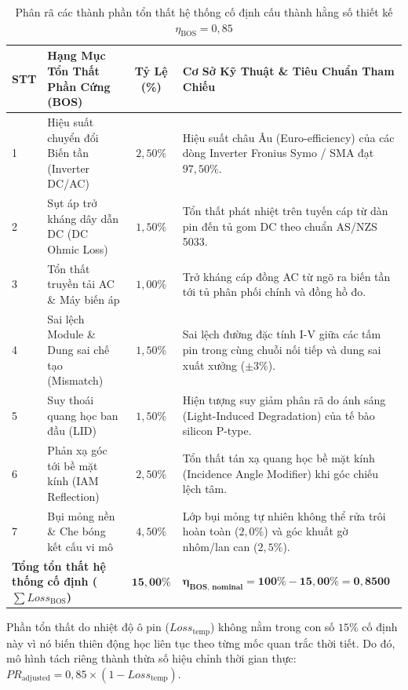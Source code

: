 \documentclass[12pt, a4paper]{report}
\begin{document}
\begin{table}[H]
\centering
\caption{Phân rã các thành phần tổn thất hệ thống cố định cấu thành hằng số thiết kế $\eta_{\text{BOS}} = 0{,}85$}
\label{tab:bos_derate_breakdown}
\small
\renewcommand{\arraystretch}{1.25}
\begin{tabularx}{\textwidth}{@{} l >{\raggedright\arraybackslash}p{4.8cm} c X @{}}
\toprule
\textbf{STT} & \textbf{Hạng Mục Tổn Thất Phần Cứng (BOS)} & \textbf{Tỷ Lệ (\%)} & \textbf{Cơ Sở Kỹ Thuật \& Tiêu Chuẩn Tham Chiếu} \\
\midrule
1 & Hiệu suất chuyển đổi Biến tần (Inverter DC/AC) & $2{,}50\%$ & Hiệu suất châu Âu (Euro-efficiency) của các dòng Inverter Fronius Symo / SMA đạt $97{,}50\%$. \\
2 & Sụt áp trở kháng dây dẫn DC (DC Ohmic Loss)     & $1{,}50\%$ & Tổn thất phát nhiệt trên tuyến cáp từ dàn pin đến tủ gom DC theo chuẩn AS/NZS 5033. \\
3 & Tổn thất truyền tải AC \& Máy biến áp            & $1{,}00\%$ & Trở kháng cáp đồng AC từ ngõ ra biến tần tới tủ phân phối chính và đồng hồ đo. \\
4 & Sai lệch Module \& Dung sai chế tạo (Mismatch)   & $1{,}50\%$ & Sai lệch đường đặc tính I-V giữa các tấm pin trong cùng chuỗi nối tiếp và dung sai xuất xưởng ($\pm 3\%$). \\
5 & Suy thoái quang học ban đầu (LID)               & $1{,}50\%$ & Hiện tượng suy giảm phân rã do ánh sáng (Light-Induced Degradation) của tế bào silicon P-type. \\
6 & Phản xạ góc tới bề mặt kính (IAM Reflection)    & $2{,}50\%$ & Tổn thất tán xạ quang học bề mặt kính (Incidence Angle Modifier) khi góc chiếu lệch tâm. \\
7 & Bụi mỏng nền \& Che bóng kết cấu vi mô           & $4{,}50\%$ & Lớp bụi mỏng tự nhiên không thể rửa trôi hoàn toàn ($2{,}0\%$) và góc khuất gờ nhôm/lan can ($2{,}5\%$). \\
\midrule
\multicolumn{2}{l}{\textbf{Tổng tổn thất hệ thống cố định ($\sum Loss_{\text{BOS}}$)}} & $\mathbf{15{,}00\%}$ & $\mathbf{\eta_{\text{BOS, nominal}} = 100\% - 15{,}00\% = 0{,}8500}$ \\
\bottomrule
\end{tabularx}
\end{table}

Phần tổn thất do nhiệt độ ô pin ($Loss_{\text{temp}}$) không nằm trong con số $15\%$ cố định này vì nó biến thiên động học liên tục theo từng mốc quan trắc thời tiết. Do đó, mô hình tách riêng thành thừa số hiệu chỉnh thời gian thực: $PR_{\text{adjusted}} = 0{,}85 \times (1 - Loss_{\text{temp}})$.
\end{document}
